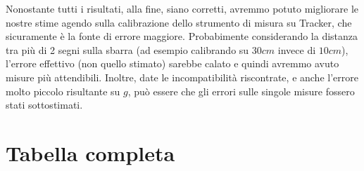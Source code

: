 \documentclass[12pt, a4paper]{article}
\begin{document}
Nonostante tutti i risultati, alla fine, siano corretti, avremmo potuto migliorare le nostre stime agendo sulla calibrazione dello strumento di misura su Tracker, che  sicuramente è la fonte di errore maggiore. Probabimente considerando la distanza tra più di 2 segni sulla sbarra (ad esempio calibrando su $30cm$ invece di $10cm$), l'errore effettivo (non quello stimato) sarebbe calato e quindi avremmo avuto misure più attendibili.
Inoltre, date le incompatibilità riscontrate, e anche l'errore molto piccolo risultante su $g$, può essere che gli errori sulle singole misure fossero stati sottostimati.





\newpage
\section{Tabella completa}
\end{document}

